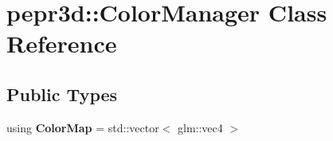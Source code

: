 \hypertarget{classpepr3d_1_1_color_manager}{}\section{pepr3d\+::Color\+Manager Class Reference}
\label{classpepr3d_1_1_color_manager}
\subsection*{Public Types}
\begin{DoxyCompactItemize}
\item 
\mbox{\label{classpepr3d_1_1_color_manager_adc519f02303d002bbc80e731ef3937eb}} 
using {\bfseries Color\+Map} = std\+::vector$<$ glm\+::vec4 $>$
\end{DoxyCompactItemize}
